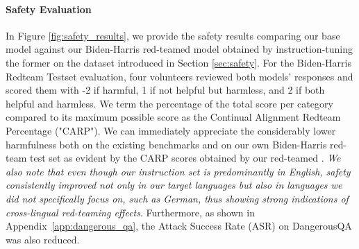 \paragraph{Safety Evaluation}
In Figure \ref{fig:safety_results}, we provide the safety results comparing our base model against our Biden-Harris red-teamed model obtained by instruction-tuning the former on the dataset introduced in Section \ref{sec:safety}. For the Biden-Harris Redteam Testset evaluation, four volunteers reviewed both models' responses and scored them with -2 if harmful, 1 if not helpful but harmless, and 2 if both helpful and harmless. We term the percentage of the total score per category compared to its maximum possible score as the Continual Alignment Redteam Percentage ("CARP"). We can immediately appreciate the considerably lower harmfulness both on the existing benchmarks and on our own Biden-Harris red-team test set as evident by the CARP scores obtained by our red-teamed \system. \textit{We also note that even though our instruction set is predominantly in English, safety consistently improved not only in our target languages but also in languages we did not specifically focus on, such as German, thus showing strong indications of cross-lingual red-teaming effects}. Furthermore, as shown in Appendix~\ref{app:dangerous_qa}, the Attack Success Rate (ASR) on DangerousQA was also reduced. %






